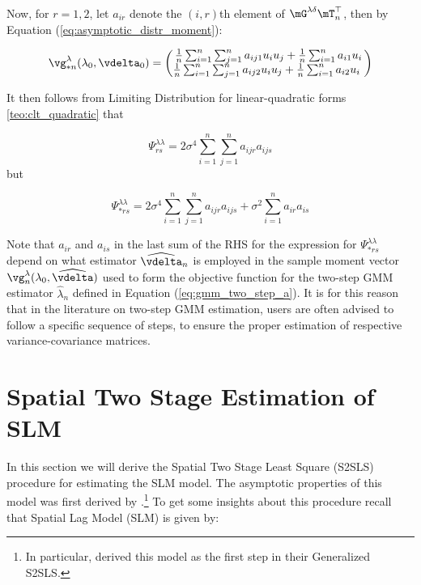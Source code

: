 \documentclass[english,12pt]{book}\usepackage[]{graphicx}\usepackage[]{xcolor}
\begin{document}
Now, for $r = 1,2$, let $a_{ir}$ denote the $(i,r)$th element of $\mG^{\lambda\delta}\mT_n^\top$, then by Equation (\ref{eq:asymptotic_distr_moment}):


\begin{equation*}
\vg_{*n}^{\lambda}(\lambda_0, \vdelta_0) = \begin{pmatrix}
\frac{1}{n}\sum_{i = 1} ^n\sum_{j = 1} ^na_{ij1}u_iu_j + \frac{1}{n}\sum_{i=1}^na_{i1}u_i\\
\frac{1}{n}\sum_{i = 1} ^n\sum_{j = 1} ^na_{ij2}u_iu_j + \frac{1}{n}\sum_{i=1}^na_{i2}u_i\
\end{pmatrix}
\end{equation*}

It then follows from Limiting Distribution for linear-quadratic forms \ref{teo:clt_quadratic} that

\begin{equation*}
\Psi_{rs}^{\lambda\lambda} = 2\sigma^4\sum_{i = 1} ^n \sum_{j = 1}^n a_{ijr}a_{ijs} 
\end{equation*}
%
but

\begin{equation*}
\Psi_{*rs}^{\lambda\lambda} = 2\sigma^4\sum_{i = 1} ^n \sum_{j = 1} ^n a_{ijr}a_{ijs} + \sigma^2\sum_{i=1}^n a_{ir}a_{is}
\end{equation*}

Note that $a_{ir}$ and $a_{is}$ in the last sum of the RHS for the expression for $\Psi_{*rs}^{\lambda\lambda}$ depend on what estimator $\widehat{\vdelta}_n$ is employed in the sample moment vector $\vg_n^{\lambda}(\lambda_0, \widehat{\vdelta})$ used to form the objective function for the two-step GMM estimator $\widehat{\lambda}_n$ defined in Equation (\ref{eq:gmm_two_step_a}). It is for this reason that in the literature on two-step GMM estimation, users are often advised to follow a specific sequence of steps, to ensure the proper estimation of respective variance-covariance matrices. 


\section{Spatial Two Stage Estimation of SLM}

In this section we will derive the Spatial Two Stage Least Square (S2SLS) procedure for estimating the SLM model. The asymptotic properties of this model was first derived by \cite{kelejian1998generalized}.\footnote{In particular, \cite{kelejian1998generalized} derived this model as the first step in their Generalized S2SLS.} To get some insights about this procedure recall that Spatial Lag Model (SLM) is given by:
\end{document}
